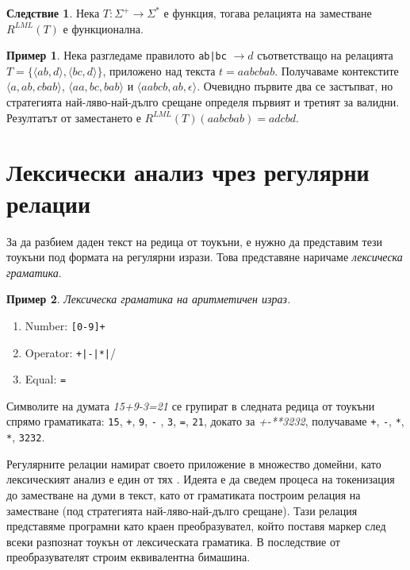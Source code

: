 \documentclass[12pt, oneside]{article}
\theoremstyle{definition}
\newtheorem{example}{Пример}[section]
\newtheorem{corollary}{Следствие}[section]
\begin{document}
\begin{corollary}
	Нека \( T: \Sigma^+ \to \Sigma^* \) е функция, тогава релацията на заместване \( R^{LML}(T) \) е функционална.
\end{corollary}

\begin{example}
	Нека разгледаме правилото \verb/ab|bc/ \( \to d \) съответстващо на релацията \(T = \{ \langle ab,d \rangle, \langle bc, d \rangle \} \), приложено над текста \( t = aabcbab \). Получаваме контекстите \( \langle a, ab, cbab \rangle \), \( \langle aa, bc, bab \rangle \) и \( \langle aabcb, ab, \epsilon \rangle \). Очевидно първите два се застъпват, но стратегията най-ляво-най-дълго срещане определя първият и третият за валидни. Резултатът от заместането е \( R^{LML}(T)(aabcbab) = adcbd \).
\end{example}

\section{Лексически анализ чрез регулярни релации}

 За да разбием даден текст на редица от тоукъни, е нужно да представим тези тоукъни под формата на регулярни изрази. Това представяне наричаме \emph{лексическа граматика}.

\begin{example}{\emph{Лексическа граматика на аритметичен израз.}}
	\label{ex:ar-gram}
	\begin{enumerate}
		\item Number: \verb/[0-9]+/
		\item Operator: \verb/+|-|*|//
		\item Equal: \verb/=/
	\end{enumerate}

	\noindent Символите на думата \emph{15+9-3=21} се групират в следната редица от тоукъни спрямо граматиката: \texttt{15}, \texttt{+}, \texttt{9}, \texttt{-} , \texttt{3}, \texttt{=}, \texttt{21}, докато за \emph{+-**3232}, получаваме \texttt{+}, \texttt{-}, \texttt{*}, \texttt{*}, \texttt{3232}.
\end{example}

Регулярните релации намират своето приложение в множество домейни, като лексическият анализ е един от тях \cite{Karttunen:96}. Идеята е да сведем процеса на токенизация до заместване на думи в текст, като от граматиката построим релация на заместване (под стратегията най-ляво-най-дълго срещане). Тази релация представяме програмни като краен преобразувател, който поставя маркер след всеки разпознат тоукън от лексическата граматика. В последствие от преобразувателят строим еквивалентна бимашина.
\end{document}
